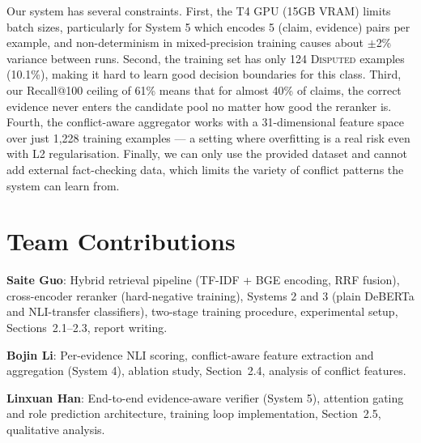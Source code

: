\documentclass[11pt]{article}
\begin{document}
Our system has several constraints.
First, the T4 GPU (15GB VRAM) limits batch sizes, particularly for
System 5 which encodes 5 (claim, evidence) pairs per example, and
non-determinism in mixed-precision training causes about $\pm$2\%
variance between runs.
Second, the training set has only 124 \textsc{Disputed} examples
(10.1\%), making it hard to learn good decision boundaries for this
class.
Third, our Recall@100 ceiling of 61\% means that for almost 40\% of
claims, the correct evidence never enters the candidate pool no matter
how good the reranker is.
Fourth, the conflict-aware aggregator works with a 31-dimensional
feature space over just 1{,}228 training examples --- a setting where
overfitting is a real risk even with L2 regularisation.
Finally, we can only use the provided dataset and cannot add external
fact-checking data, which limits the variety of conflict patterns the
system can learn from.

\section*{Team Contributions}

\textbf{Saite Guo}: Hybrid retrieval pipeline (TF-IDF + BGE encoding,
RRF fusion), cross-encoder reranker (hard-negative training),
Systems 2 and 3 (plain DeBERTa and NLI-transfer classifiers),
two-stage training procedure, experimental setup, Sections~2.1--2.3, report writing.

\textbf{Bojin Li}: Per-evidence NLI scoring, conflict-aware feature
extraction and aggregation (System 4), ablation study,
Section~2.4, analysis of conflict features.

\textbf{Linxuan Han}: End-to-end evidence-aware verifier (System 5),
attention gating and role prediction architecture, training loop
implementation, Section~2.5, qualitative analysis.


\end{document}
